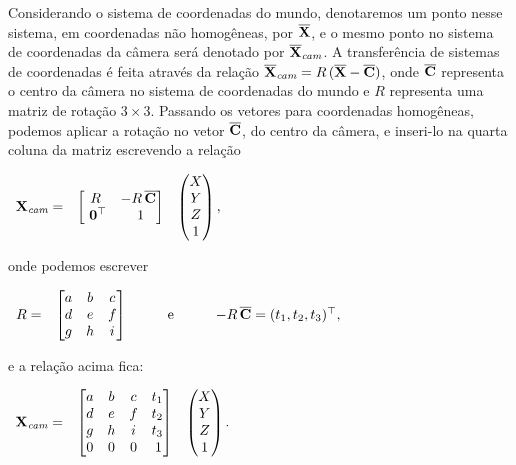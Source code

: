 Considerando o sistema de coordenadas do mundo, denotaremos um ponto nesse sistema, em coordenadas não homogêneas, por $\overline{\mathbf{X}}$, e o mesmo ponto no sistema de coordenadas da câmera será denotado por $\overline{\mathbf{X}}_{\textit{cam}}$. A transferência de sistemas de coordenadas é feita através da relação $\overline{\mathbf{X}}_{\textit{cam}}=R\,(\overline{\mathbf{X}}-\overline{\bf C})$, onde $\overline{\bf C}$ representa o centro da câmera no sistema de coordenadas do mundo e $R$ representa uma matriz de rotação $3\times3$. Passando os vetores para coordenadas homogêneas, podemos aplicar a rotação no vetor $\overline{\bf C}$, do centro da câmera, e inseri-lo na quarta coluna da matriz escrevendo a relação
\begin{center}
$
\begin{array}{ccc}
\mathbf{X}_{\textit{cam}}=
&
\begin{bmatrix}
R&-R\,\overline{\bf C}\\
\,\,{\bf 0}^\top&\,\,1
\end{bmatrix}
&
\begin{pmatrix}
X\\
Y\\
Z\\
1
\end{pmatrix},
\end{array}
$
\end{center} 
onde podemos escrever
\begin{center}
$
\begin{array}{cccc}
R=
&
\begin{bmatrix}
a&b&c\\
d&e&f\\
g&h&i
\end{bmatrix}
&
\qquad\text{e}\qquad
&
-R\,\overline{\bf C}=(t_1,t_2,t_3)^\top,
\end{array}
$
\end{center}
e a relação acima fica:
\begin{center}
$
\begin{array}{ccc}
\mathbf{X}_{\textit{cam}}=
&
\begin{bmatrix}
a&b&c&t_1\\
d&e&f&t_2\\
g&h&i&t_3\\
0&0&0&\,1
\end{bmatrix}
&
\begin{pmatrix}
X\\
Y\\
Z\\
1
\end{pmatrix}.
\end{array}
$
\end{center}
